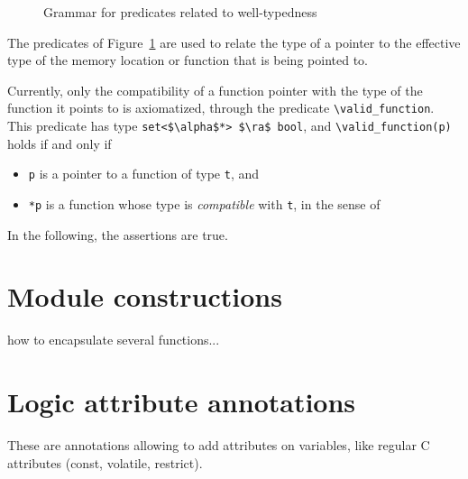 \begin{figure}[h]
  \begin{cadre}
      
    \end{cadre}
  \caption{Grammar for predicates related to well-typedness }
\label{fig:gram:welltyped}
\end{figure}

The predicates of Figure~\ref{fig:gram:welltyped} are used to relate
the type of a pointer to the effective type of the memory location or function
that is being pointed to.

Currently, only the compatibility of a function pointer with the type of
the function it points to is axiomatized, through the predicate
\lstinline|\valid_function|. This predicate has type
\lstinline|set<$\alpha$*> $\ra$ bool|,
and \lstinline|\valid_function(p)| holds if and only if
\begin{itemize}
\item \lstinline|p| is a pointer to a function of type \lstinline|t|, and
\item \lstinline|*p| is a function whose type is \emph{compatible}
  with \lstinline|t|, in the sense of \cite[\S6.2.7]{standardc99}
\end{itemize}

\begin{example}
  In the following, the assertions are true.
\end{example}


\section{Module constructions}

\experimental

how to encapsulate several functions...


\section{Logic attribute annotations}
\label{sec:attribute_annot}

\experimental

These are annotations allowing to add attributes on variables, like regular C attributes (const, volatile, restrict).

